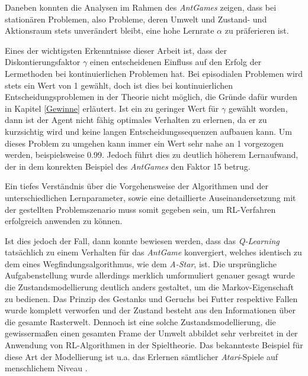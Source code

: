 \par 
Daneben konnten die Analysen im Rahmen des \textit{AntGames} zeigen, dass bei stationären Problemen, also Probleme, deren Umwelt und Zustand- und Aktionsraum stets unverändert bleibt, eine hohe Lernrate $\alpha$ zu präferieren ist.
\par 
Eines der wichtigsten Erkenntnisse dieser Arbeit ist, dass der Diskontierungsfaktor $\gamma$ einen entscheidenen Einfluss auf den Erfolg der Lermethoden bei kontinuierlichen Problemen hat. Bei episodialen Problemen wird stets ein Wert von 1 gewählt, doch ist dies bei kontinuierlichen Entscheidungsproblemen in der Theorie nicht möglich, die Gründe dafür wurden in Kapitel \ref{Gewinne} erläutert. Ist ein zu geringer Wert für $\gamma$ gewählt worden, dann ist der Agent nicht fähig optimales Verhalten zu erlernen, da er zu \glqq kurzsichtig\grqq{} wird und keine langen Entscheidungssequenzen aufbauen kann. Um dieses Problem zu umgehen kann immer ein Wert sehr nahe an 1 vorgezogen werden, beispielsweise 0.99. Jedoch führt dies zu deutlich höherem Lernaufwand, der in dem konrekten Beispiel des \textit{AntGames} den Faktor 15 betrug.
\par
Ein tiefes Verständnis über die Vorgehensweise der Algorithmen und der unterschiedlichen Lernparameter, sowie eine detaillierte Auseinandersetzung mit der gestellten Problemszenario muss somit gegeben sein, um RL-Verfahren erfolgreich anwenden zu können.
\par 
Ist dies jedoch der Fall, dann konnte bewiesen werden, dass das \textit{Q-Learning} tatsächlich zu einem Verhalten für das \textit{AntGame} konvergiert, welches identisch zu dem eines Wegfindungsalgorithmus, wie dem \textit{A-Star}, ist. Die ursprüngliche Aufgabenstellung wurde allerdings merklich umformuliert genauer gesagt wurde die Zustandsmodellierung deutlich anders gestaltet, um die Markov-Eigenschaft zu bedienen. Das Prinzip des Gestanks und Geruchs bei Futter respektive Fallen wurde komplett verworfen und der Zustand besteht aus  den Informationen über die gesamte Rasterwelt. Dennoch ist eine solche Zustandsmodellierung, die gewissermaßen einen gesamten Frame der Umwelt abbildet sehr verbreitet in der Anwendung von RL-Algorithmen in der Spieltheorie. Das bekannteste Beispiel für diese Art der Modellierung ist u.a. das Erlernen sämtlicher \textit{Atari}-Spiele auf menschlichem Niveau \cite{dqn}.
\par 
